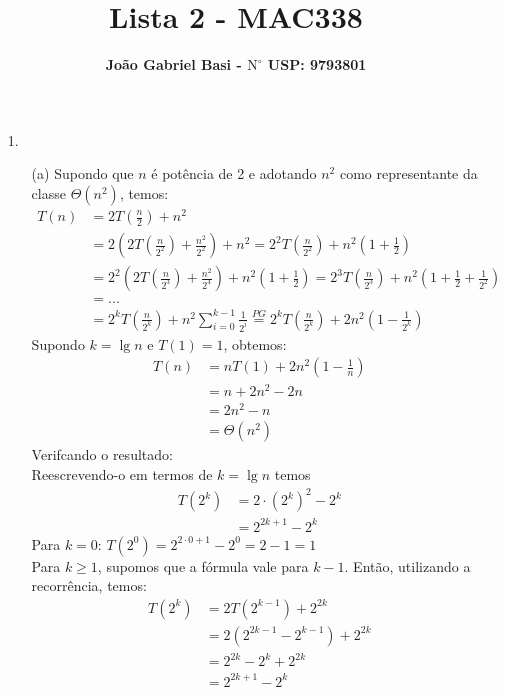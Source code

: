 \documentclass[12pt, a4paper]{article} %
\title{ \textbf{Lista 2 - MAC338}}
\date{}
\author{ \textbf{João Gabriel Basi - $\text{N}^\circ$ USP: 9793801}}
\begin{document}
\maketitle
\begin{enumerate}
\item[1.]
\begin{enumerate}
\item[(a)]
Supondo que $n$ é potência de 2 e adotando $n^2$ como representante da classe
$\Theta(n^2)$, temos:
\begin{align*}
T(n) &= 2T\left(\frac{n}{2}\right) + n^2\\
     &= 2\left(2T\left(\frac{n}{2^2}\right) + \frac{n^2}{2^2}\right) + n^2 = 2^2T\left(\frac{n}{2^2}\right) + n^2\left(1 + \frac{1}{2}\right)\\
     &= 2^2\left(2T\left(\frac{n}{2^3}\right) + \frac{n^2}{2^4}\right) + n^2\left(1 + \frac{1}{2}\right) = 2^3T\left(\frac{n}{2^3}\right) + n^2\left(1 + \frac{1}{2} + \frac{1}{2^2}\right)\\
     &= ...\\
     &= 2^kT\left(\frac{n}{2^k}\right) + n^2\sum_{i=0}^{k-1}\frac{1}{2^i} \stackrel{PG}{=} 2^kT\left(\frac{n}{2^k}\right) + 2n^2\left(1-\frac{1}{2^k}\right)
\end{align*}
Supondo $k = \lg n$ e $T(1) = 1$, obtemos:
\begin{align*}
T(n) &= nT(1) + 2n^2\left(1-\frac{1}{n}\right)\\
     &= n + 2n^2 - 2n\\
     &= 2n^2 - n\\
     &= \Theta(n^2)
\end{align*}
Verifcando o resultado:\\
Reescrevendo-o em termos de $k = \lg n$ temos
\begin{align*}
T(2^k) &= 2\cdot (2^k)^2 - 2^k \\
       &= 2^{2k+1} - 2^k
\end{align*}
Para $k = 0$: $T(2^0) = 2^{2\cdot 0 + 1} - 2^0 = 2 - 1 = 1$\\
Para $k \geqslant 1$, supomos que a fórmula vale para $k - 1$. Então, utilizando
a recorrência, temos:
\begin{align*}
T(2^k) &= 2T(2^{k-1}) + 2^{2k} \\
       &= 2(2^{2k-1} - 2^{k-1}) + 2^{2k}\\
       &= 2^{2k} - 2^k + 2^{2k}\\
       &= 2^{2k+1} - 2^k\\
\end{align*}


\end{enumerate}
\end{enumerate}
\end{document}
